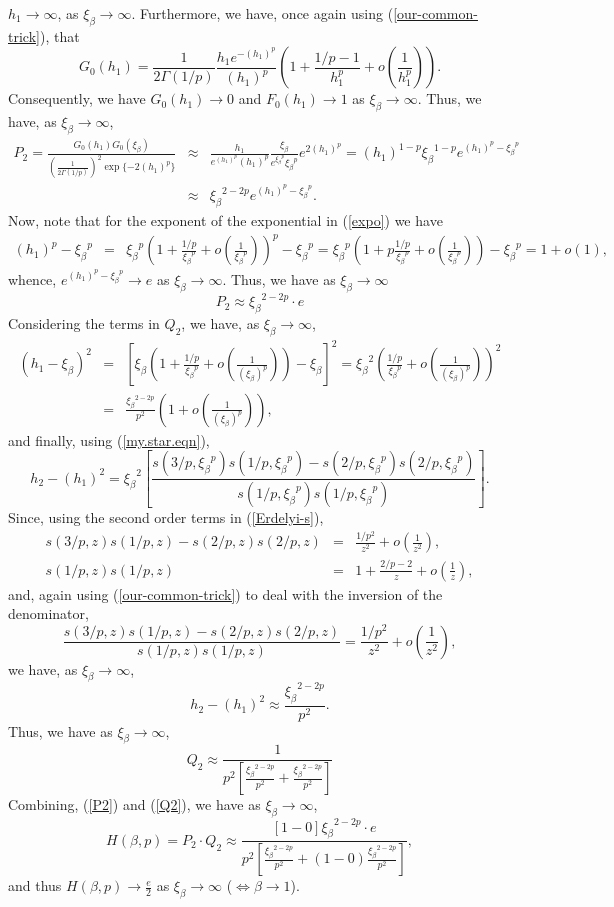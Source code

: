 \documentclass[11pt]{article}
\newcommand{\ds}{\displaystyle}
\newcommand{\be}{\begin{equation}}
\newcommand{\ee}{\end{equation}}
\newcommand{\bes}{\begin{equation*}}
\newcommand{\ees}{\end{equation*}}
\newcommand{\ba}{\begin{eqnarray}}
\newcommand{\ea}{\end{eqnarray}}
\newcommand{\bas}{\begin{eqnarray*}}
\newcommand{\eas}{\end{eqnarray*}}
\newcommand{\B}{\ensuremath{\xi_{\beta}}}
\newcommand{\al}{\ensuremath{\beta}}
\newcommand{\nc}{\normalcolor}
\begin{document}
$h_1 \rightarrow \infty$, as $\B \rightarrow \infty$.  Furthermore, we
have, once again using (\ref{our-common-trick}), that 
\be
G_0(h_1) = \frac{1}{2\Gamma(1/p)}\frac{h_1 e^{-(h_1)^p}}{(h_1)^p} \left(1 + \frac{1/p-1}{h_1^p} +  o\left(\frac{1}{h_1^p}\right) \right) .
\ee
Consequently, we have $G_0(h_1) \rightarrow 0$ and $F_0(h_1) \rightarrow 1$ as $\B \rightarrow \infty$.  Thus, we have, as $\B \rightarrow \infty$,
\ba \nonumber
P_2 = \frac{G_0(h_1)G_0(\B)}{(\frac{1}{2\Gamma(1/p)})^2\exp\{-2\left(h_1\right)^p\}} &\approx&
\frac{ h_1}{e^{(h_1)^p}(h_1)^p} \frac{\B}{e^{\B^p}\B^p} e^{2(h_1)^p}
=(h_1)^{1-p} \B^{1-p} e^{(h_1)^p-\B^p} \nonumber \\
&\approx& \B^{2-2p} e^{(h_1)^p-\B^p}.\label{expo}
\ea
Now, note that for the exponent of the exponential in (\ref{expo}) we have
\bas
(h_1)^p-\B^p &=& \B^p \left(1+\frac{1/p}{\B^p} + o\left(\frac{1}{\B^p}\right) \right)^p -\B^p = \B^p \left(1+p\frac{1/p}{\B^p} + o\left(\frac{1}{\B^p}\right) \right) - \B^p = 1 + o(1),
\eas
whence, $e^{(h_1)^p-\B^p} \rightarrow e$ as $\B \rightarrow \infty$. Thus, we have as $\B \rightarrow \infty$
\be \label{P2}
P_2 \approx {\B}^{2-2p} \cdot e
\ee
Considering the terms in $Q_2$, we have, as $\B \rightarrow \infty$,
\bas
(h_1 - \B)^2 &=&  \left[\B\left( 1 + \frac{1/p}{\B^p} + o\left(\frac{1}{(\B)^p}\right) \right) -\B\right]^2  =\B^2\left(\frac{1/p}{\B^p} + o\left(\frac{1}{(\B)^p}\right) \right)^2  \\
&=&\frac{\B^{2-2p}}{p^2} \left(1 +  o\left(\frac{1}{(\B)^p}\right) \right),
\eas
and finally,  using (\ref{my.star.eqn}),
\be
h_2 - (h_1)^2 = \B^2\left[ \frac{s(3/p,\B^p)s(1/p,\B^p) - s(2/p,\B^p)s(2/p,\B^p)}{s(1/p,\B^p)s(1/p,\B^p)}\right] .
\ee
Since, using the second order terms in (\ref{Erdelyi-s}),
\bas
s(3/p,z)s(1/p,z) - s(2/p,z)s(2/p,z) &=& \frac{1/p^2}{z^2} +  o\left(\frac{1}{z^2}\right), \\
s(1/p,z)s(1/p,z) &=& 1 + \frac{2/p-2}{z} + o\left(\frac{1}{z}\right),
\eas
and, again using (\ref{our-common-trick}) to deal with the
inversion of the denominator,
\bes
\frac{s(3/p,z)s(1/p,z) - s(2/p,z)s(2/p,z)}{s(1/p,z)s(1/p,z)} = \frac{1/p^2}{z^2} + o\left(\frac{1}{z^2}\right),
\ees
we have, as $\B \rightarrow \infty$,
\bes
h_2 - (h_1)^2 \approx \frac{\B^{2-2p}}{p^2} .
\ees
%
Thus, we have as $\B \rightarrow \infty$,
\be \label{Q2}
Q_2 \approx \frac{1}{p^2[\frac{{\B}^{2-2p}}{p^2} + \frac{{\B}^{2-2p}}{p^2}]}
\ee
Combining, (\ref{P2}) and (\ref{Q2}), we have \nc as $\B \rightarrow \infty$,
\be\label{case2-H-final}
H(\beta,p) = P_2 \cdot Q_2 \approx \frac{[1-0] \B^{2-2p}\cdot e} {p^2\left[\frac{\B^{2-2p}}{p^2} + (1-0)\frac{\B^{2-2p}}{p^2}\right]} ,
\ee
and thus ${\ds H(\beta,p) \rightarrow \frac{e}{2} }$ as $\B
\rightarrow \infty$ ($\Leftrightarrow\al \rightarrow 1$).
\end{document}
